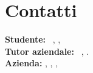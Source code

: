 \section*{Contatti}
\textbf{Studente:} \nomeStudente\ \cognomeStudente, \href{mailto:\emailStudente}{\emailStudente}, \telStudente \\
\textbf{Tutor aziendale:} \nomeTutorAziendale\ \cognomeTutorAziendale, \href{mailto:\emailTutorAziendale}{\emailTutorAziendale} \telTutorAziendale .\\
\textbf{Azienda:} \ragioneSocAzienda, \indirizzoAzienda,
 \sedeOperativa, \href{\sitoAzienda}{\sitoAzienda}
